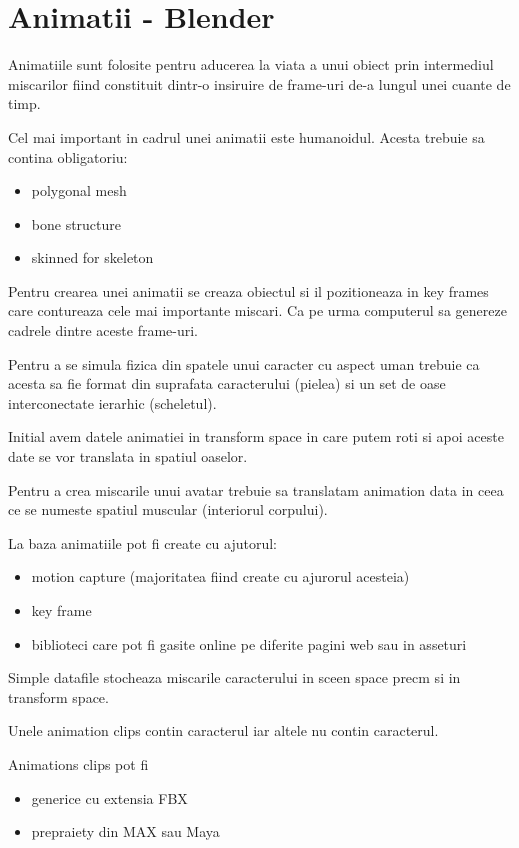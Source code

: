 \documentclass[12pt,a4paper]{report}
\begin{document}
\section{Animatii - Blender}
Animatiile sunt folosite pentru aducerea la viata a unui obiect prin intermediul miscarilor fiind constituit dintr-o insiruire de frame-uri de-a lungul unei cuante de timp. 

Cel mai important in cadrul unei animatii este humanoidul. Acesta trebuie sa contina obligatoriu:
\begin{itemize}
    \item polygonal mesh
    \item bone structure
    \item skinned for skeleton 
\end{itemize}

Pentru crearea unei animatii se creaza obiectul si il pozitioneaza in key frames care contureaza cele mai importante miscari. Ca pe urma computerul sa genereze cadrele dintre aceste frame-uri.


Pentru a se simula fizica din spatele unui caracter cu aspect uman trebuie ca acesta sa fie format din suprafata caracterului (pielea) si un set de oase interconectate ierarhic (scheletul).


Initial avem datele animatiei in transform space in care putem roti si apoi aceste date se vor translata in spatiul oaselor.

Pentru a crea miscarile unui avatar trebuie sa translatam animation data in ceea ce se numeste spatiul muscular (interiorul corpului).

La baza animatiile pot fi create cu ajutorul:

\begin{itemize}
	\item motion capture (majoritatea fiind create cu ajurorul acesteia)
	\item key frame
	\item biblioteci care pot fi gasite online pe diferite pagini web sau in asseturi
\end{itemize}

Simple datafile stocheaza miscarile caracterului in sceen space precm si in transform space.

Unele animation clips contin caracterul iar altele nu contin caracterul.

Animations clips pot fi 
\begin{itemize}
    \item generice cu extensia FBX
    \item prepraiety din MAX sau Maya
\end{itemize}
\end{document}
